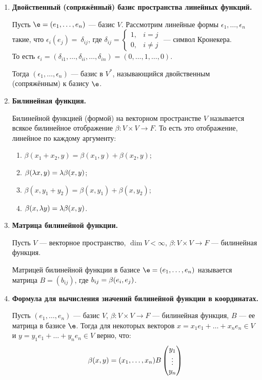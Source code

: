 \begin{enumerate}
\item \textbf{Двойственный (сопряжённый) базис пространства линейных функций.} 

Пусть $\e = (e_1, \ldots, e_n)$ --- базис $V$. Рассмотрим линейные формы $\epsilon_1, \ldots, \epsilon_n$ такие, что $\epsilon_i(e_j) =~\delta_{ij}$, где $\delta_{ij} =
\begin{cases}
1, & i = j \\
0, & i \neq j
\end{cases}
$ --- символ Кронекера. \\То есть $\epsilon_i = (\delta_{i1}, \ldots, \delta_{ii}, \ldots, \delta_{in}) = (0, \ldots, 1, \ldots, 0)$.

Тогда $(\epsilon_1, \ldots, \epsilon_n)$ --- базис в $V^*$, называющийся двойственным (сопряжённым) к базису $\e$.
\item \textbf{Билинейная функция.}

Билинейной функцией (формой) на векторном пространстве $V$ называется всякое билинейное отображение $\beta \colon V \times V \rightarrow F$. То есть это отображение, линейное по каждому аргументу:
\begin{enumerate}
\item $\beta(x_1 + x_2, y) = \beta(x_1, y) + \beta(x_2, y)$; 
\item $\beta(\lambda x, y) = \lambda\beta(x, y)$;
\item $\beta(x, y_1 + y_2) = \beta(x, y_1) + \beta(x, y_2)$;
\item $\beta(x, \lambda y) = \lambda\beta(x, y)$.
\end{enumerate}

\item \textbf{Матрица билинейной функции.}

Пусть $V$ --- векторное пространство, $\dim V < \infty$, $\beta \colon V \times V \rightarrow F$ --- билинейная функция.

Матрицей билинейной функции в базисе $\e = (e_1, \ldots, e_n)$ называется матрица $B = (b_{ij})$, где $b_{ij} \hm= \beta(e_i, e_j)$.

\item \textbf{Формула для вычисления значений билинейной функции в координатах.}

Пусть $(e_1, \ldots, e_n)$ --- базис $V$, $\beta \colon V \times V \to F$ --- билинейная функция, $B$ --- ее матрица в базисе $\e $. Тогда для некоторых векторов $x = x_1e_1 + \ldots + x_ne_n \in V$ и $y = y_1e_1 + \ldots + y_ne_n \in V$ верно, что:
\begin{gather*}
\beta(x, y) = (x_1, \ldots, x_n)B \begin{pmatrix}{y}_1 \\\vdots\\{y}_n\end{pmatrix}
\end{gather*}


\end{enumerate}
